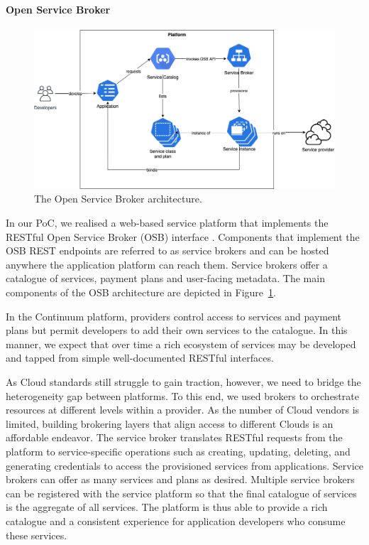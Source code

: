 \paragraph{Open Service Broker}

\begin{figure}[ht]
\centering
\includegraphics[width=\columnwidth]{figures/osb}
\caption{The Open Service Broker architecture.} \label{fig:osb}
\end{figure}

In our PoC, we realised a web-based service platform that implements the RESTful Open Service Broker (OSB) interface \cite{osb}. Components that implement the OSB REST endpoints are referred to as service brokers and can be hosted anywhere the application platform can reach them. Service brokers offer a catalogue of services, payment plans and user-facing metadata. The main components of the OSB architecture are depicted in Figure~\ref{fig:osb}.

In the Continuum platform, providers control access to services and payment plans but permit developers to add their own services to the catalogue. In this manner, we expect that over time a rich ecosystem of services may be developed and tapped from simple well-documented RESTful interfaces.

As Cloud standards still struggle to gain traction, however, we need to bridge the heterogeneity gap between platforms. 
To this end, we used brokers to orchestrate resources at different levels within a provider. As the number of Cloud vendors is limited, building brokering layers that align access to different Clouds is an affordable endeavor. The service broker translates RESTful requests from the platform to service-specific operations such as creating, updating, deleting, and generating credentials to access the provisioned services from applications. Service brokers can offer as many services and plans as desired. Multiple service brokers can be registered with the service platform so that the final catalogue of services is the aggregate of all services. The platform is thus able to provide a rich catalogue and a consistent experience for application developers who consume these services.

